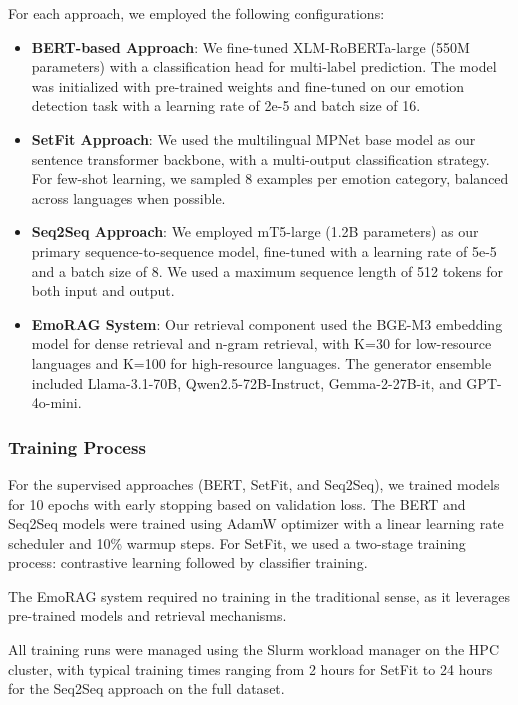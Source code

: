 \documentclass[a4paper,12pt]{extarticle}
\begin{document}
For each approach, we employed the following configurations:

\begin{itemize}
\item \textbf{BERT-based Approach}: We fine-tuned XLM-RoBERTa-large (550M parameters) with a classification head for multi-label prediction. The model was initialized with pre-trained weights and fine-tuned on our emotion detection task with a learning rate of 2e-5 and batch size of 16.

\item \textbf{SetFit Approach}: We used the multilingual MPNet base model as our sentence transformer backbone, with a multi-output classification strategy. For few-shot learning, we sampled 8 examples per emotion category, balanced across languages when possible.

\item \textbf{Seq2Seq Approach}: We employed mT5-large (1.2B parameters) as our primary sequence-to-sequence model, fine-tuned with a learning rate of 5e-5 and a batch size of 8. We used a maximum sequence length of 512 tokens for both input and output.

\item \textbf{EmoRAG System}: Our retrieval component used the BGE-M3 embedding model for dense retrieval and n-gram retrieval, with K=30 for low-resource languages and K=100 for high-resource languages. The generator ensemble included Llama-3.1-70B, Qwen2.5-72B-Instruct, Gemma-2-27B-it, and GPT-4o-mini.
\end{itemize}

\subsubsection{Training Process}

For the supervised approaches (BERT, SetFit, and Seq2Seq), we trained models for 10 epochs with early stopping based on validation loss. The BERT and Seq2Seq models were trained using AdamW optimizer with a linear learning rate scheduler and 10\% warmup steps. 
For SetFit, we used a two-stage training process: contrastive learning followed by classifier training.

The EmoRAG system required no training in the traditional sense, as it leverages pre-trained models and retrieval mechanisms. 

All training runs were managed using the Slurm workload manager on the HPC cluster, with typical training times ranging from 2 hours for SetFit to 24 hours for the Seq2Seq approach on the full dataset.
\end{document}
